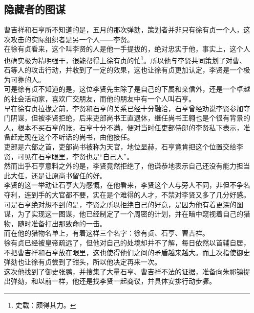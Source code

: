 \begin{multicols}{\theparacolNo}
\subsection{隐藏者的图谋}
曹吉祥和石亨所不知道的是，五月的那次弹劾，策划者并非只有徐有贞一个人，这次攻击的实际组织者是另一个人——李贤。\\

在徐有贞看来，这个叫李贤的人是他一手提拔的，绝对忠实于他，事实上，这个人也确实极为精明强干，很能帮得上徐有贞的忙\footnote{史载：颇得其力。}。所以他与李贤共同策划了对曹、石等人的攻击行动，并收到了一定的效果，这也让徐有贞更加认定，李贤是一个极为可靠的人。\\

可是徐有贞不知道的是，这位李贤先生除了是自己的下属和亲信外，还是一个卓越的社会活动家，喜欢广交朋友，而他的朋友中有一个人叫石亨。\\

早在徐有贞拉拢之前，李贤和石亨的关系已经十分融洽，石亨曾经劝说李贤参加夺门阴谋，但被李贤拒绝，后来吏部尚书王直退休，继任尚书王翱也是个很有背景的人，根本不买石亨的账，石亨十分不满，便对当时任吏部侍郎的李贤私下表示，准备赶走现在这个不听话的尚书，由他接任。\\

吏部是六部之首，吏部尚书被称为天官，地位显赫，石亨竟肯把这个位置交给李贤，可见在石亨眼里，李贤也是“自己人”。\\

然而出乎石亨意料之外的是，李贤竟然拒绝了，他谦恭地表示自己还没有能力担当此大任，还是让原尚书留任的好。\\

李贤的这一举动让石亨大为感慨，在他看来，李贤这个人与旁人不同，非但不争名夺利，连到手的大官都不要，实在是个难得的人才，不禁对李贤又多了几分好感。\\

可是石亨绝对想不到的是，李贤之所以拒绝自己的好意，是因为他有着更深的图谋，为了实现这一图谋，他已经制定了一个周密的计划，并在暗中窥视着自己的猎物，随时准备打出那致命的一击。\\

而在他的猎物名单上，有着这样三个名字：徐有贞、石亨、曹吉祥。\\

徐有贞已经被皇帝疏远了，但他对自己的处境却并不了解，每日依然以首辅自居，不把曹吉祥和石亨放在眼里，这也使得他们之间的矛盾越来越大。而上次指使御史弹劾也让徐有贞尝到了甜头，所以他决定再来一次。\\

这次他找到了御史张鹏，并搜集了大量石亨、曹吉祥不法的证据，准备向朱祁镇提出弹劾，和以前一样，他还是找李贤一起商议，并具体安排行动步骤。\\


\end{multicols}
